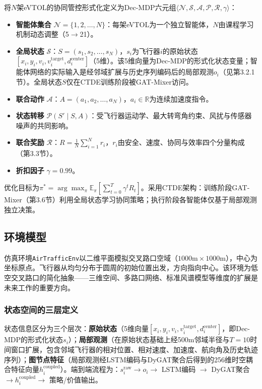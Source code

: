 \documentclass[12pt,a4paper,UTF8]{ctexart}
\begin{document}
将$N$架eVTOL的协同管控形式化定义为Dec-MDP六元组$\langle \mathcal{N}, \mathcal{S}, \mathcal{A}, \mathcal{P}, \mathcal{R}, \gamma \rangle$：

\begin{itemize}
    \item \textbf{智能体集合} $\mathcal{N} = \{1, 2, \ldots, N\}$：每架eVTOL为一个独立智能体，$N$由课程学习机制动态调整（5$\to$21）。
    \item \textbf{全局状态} $\mathcal{S}$：$S = (s_1, s_2, \ldots, s_N)$，$s_i$为飞行器$i$的原始状态$[x_i, y_i, v_i, v_i^{\text{target}}, d_i^{\text{center}}]$（5维）。该5维向量为Dec-MDP的形式化状态变量；智能体网络的实际输入是经邻域扩展与历史序列编码后的局部观测$o_i$（见第3.2.1节）。全局状态$S$仅在CTDE训练阶段被GAT-Mixer访问。
    \item \textbf{联合动作} $\mathcal{A}$：$A = (a_1, a_2, \ldots, a_N)$，$a_i \in \mathbb{R}$为连续加速度指令。
    \item \textbf{状态转移} $\mathcal{P}(S' \mid S, A)$：受飞行器运动学、最大转弯角约束、风扰与传感器噪声的共同影响。
    \item \textbf{联合奖励} $\mathcal{R}$：$R = \frac{1}{N}\sum_{i=1}^{N} r_i$，$r_i$由安全、速度、协同与效率四个分量构成（第3.3节）。
    \item \textbf{折扣因子} $\gamma = 0.99$。
\end{itemize}

优化目标为$\pi^* = \arg\max_\pi \mathbb{E}_{\pi}[\sum_{t=0}^{T} \gamma^t R_t]$。采用CTDE架构：训练阶段GAT-Mixer（第3.6节）利用全局状态学习协同策略；执行阶段各智能体仅基于局部观测独立决策。

\subsection{环境模型}

仿真环境\texttt{AirTrafficEnv}以二维平面模拟交叉路口空域（$1000\text{m} \times 1000\text{m}$），中心为坐标原点。飞行器从均匀分布于圆周的初始位置出发，方向指向中心。该环境为低空交叉路口的简化抽象——三维空间、多路口网络、标准风谱模型等维度的扩展是未来工作的重要方向。

\subsubsection{状态空间的三层定义}

状态信息区分为三个层次：\textbf{原始状态}（5维向量$[x_i, y_i, v_i, v_i^{\text{target}}, d_i^{\text{center}}]$，即Dec-MDP的形式化状态$s_i$）；\textbf{局部观测}（在原始状态基础上经500m邻域半径与$T=10$时间窗口扩展，包含邻域飞行器的相对位置、相对速度、加速度、航向角及历史轨迹序列）；\textbf{图节点特征}（局部观测经LSTM编码与DyGAT聚合后得到的256维时空耦合特征向量$h_i^{\text{coupled}}$）。端到端流程为：$s_i^{\text{raw}} \to o_i \to$ LSTM编码 $\to$ DyGAT聚合 $\to h_i^{\text{coupled}} \to$ 策略/价值输出。
\end{document}
